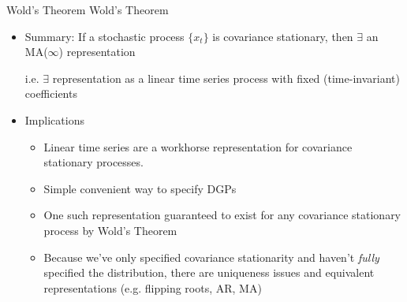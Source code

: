 \documentclass[handout]{beamer}
\begin{document}
\begin{frame}[shrink]{Wold's Theorem}
Wold's Theorem
\begin{itemize}
  \item
    Summary:
    If a stochastic process $\{x_t\}$ is \alert{covariance stationary},
    then \alert{$\exists$} an \alert{MA($\infty$)}
    \alert{representation}

    \pause
    i.e. $\exists$ representation as a \alert{linear time series
    process} with fixed (time-invariant) coefficients

  \pause
  \item
    Implications
    \begin{itemize}
      \item Linear time series are a \alert{workhorse representation}
        for covariance stationary processes.
      \item Simple convenient way to specify DGPs
      \item One such representation guaranteed to exist for any
        covariance stationary process by Wold's Theorem
      \item Because we've only specified covariance stationarity and
        haven't \emph{fully} specified the distribution, there are
        uniqueness issues and equivalent representations (e.g. flipping
        roots, AR, MA)
    \end{itemize}


\end{itemize}
\end{frame}
\end{document}
